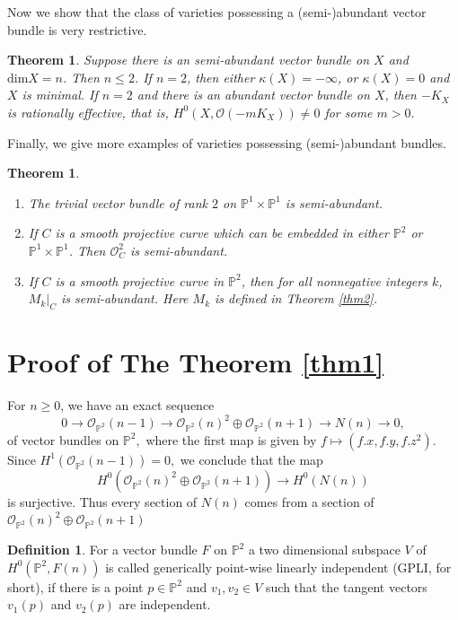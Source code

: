 \documentclass[11pt]{amsart}
\newtheorem{thm}[subsection]{Theorem}
\theoremstyle{definition}
\newtheorem{Def}[subsection]{Definition}
\begin{document}
Now we show that the class of varieties possessing a (semi-)abundant vector bundle is very restrictive.
\begin{thm}\label{thm4}
Suppose there is an semi-abundant vector bundle on $X$ and $\textrm{dim} X=n$. Then 
$n\leq 2$. If $n= 2$, then either 
$\kappa(X)=-\infty$, or $\kappa(X)=0$ and $X$ is minimal. If
$n= 2$ and there is an abundant vector bundle on $X$, then 
$-K_X$ is rationally effective, that is, 
$H^0(X,\mathcal{O}(-mK_X))\neq 0$ for some $m>0.$
\end{thm}

Finally, we give more examples of varieties possessing (semi-)abundant bundles.

\begin{thm}\label{thm5}
\noindent\begin{enumerate}
    \item The trivial vector bundle of rank $2$ on $\mathbb{P}^1\times \mathbb{P}^1$ is semi-abundant.
    \item If $C$ is a smooth projective curve which can be embedded in either $\mathbb{P}^2$ or $\mathbb{P}^1\times \mathbb{P}^1$. Then $\mathcal{O}_C^2$ is semi-abundant.
    \item If $C$ is a smooth projective curve in $\mathbb{P}^2$, then for all nonnegative integers $k$, $M_k|_{C}$ is semi-abundant. Here $M_k$ is defined in Theorem \ref{thm2}.
\end{enumerate}
\end{thm}
 
\section{Proof of The Theorem \ref{thm1}}

For $n\geq 0$, we have an exact
sequence 
 \begin{equation}\label{euler}
 0 \to {\mathcal O}_{\mathbb{P}^2}(n-1) \to {\mathcal O}_{\mathbb{P}^2}(n)^2\oplus{\mathcal O}_{\mathbb{P}^2}(n+1) \to N(n) \to 0,
 \end{equation} 
of vector bundles on $\mathbb{P}^2,$ where the first map is given 
by $f\mapsto (f.x,f.y,f.z^2).$
Since $H^1(\mathcal{O}_{\mathbb{P}^2}(n-1))=0,$
we conclude that the map 
$$H^0({\mathcal O}_{\mathbb{P}^2}(n)^2\oplus{\mathcal O}_{\mathbb{P}^2}(n+1)) \to H^0(N(n)) $$
is surjective. Thus every section of  $N(n)$ comes from a section of $\mathcal {O}_{\mathbb{P}^2}(n)^2\oplus{\mathcal O}_{\mathbb{P}^2}(n+1)$
 \begin{Def}\label{generic} For a vector bundle $F$ on $\mathbb{P}^2$ a two dimensional subspace $V$ of $H^0(\mathbb{P}^2, F(n))$ is called generically point-wise
 linearly independent  (GPLI, for short), if there is a point $p \in {\mathbb{P}^2}$ and 
 $v_1, v_2 \in V$ such that the tangent vectors $v_1(p) $ and $ v_2 (p) $ are independent.
 \end{Def}
 
\end{document}
